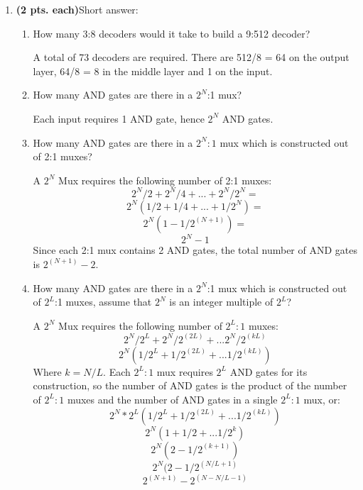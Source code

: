 \begin{enumerate}
\item {\bf (2 pts. each)}Short answer:
\begin{enumerate}
        \item How many 3:8 decoders would it take to build a 9:512 decoder?

	\begin{solution}{A total of 73 decoders are required.  There are 512/8 = 64 on
	the output layer, 64/8 = 8 in the middle layer and 1 on the input.}\end{solution}
        \item How many AND gates are there in a $2^N$:1 mux?

	\begin{solution}{ Each input requires 1 AND gate, hence $2^N$ AND gates.} \end{solution}
        \item How many AND gates are there in a $2^N:1$ mux which is
                constructed out of 2:1 muxes?

	\begin{solution}{ A $2^N$ Mux requires the following number of 2:1 muxes: 
        $$ 2^N/2 + 2^N/4 + ... + 2^N/2^N = $$
        $$ 2^N(1/2 + 1/4 + ... + 1/2^N) = $$
        $$ 2^N(1-1/2^(N+1)) =  $$
        $$ 2^N - 1  $$
	Since each 2:1 mux contains 2 AND gates, the total number of AND gates is
	$2^(N+1) - 2$.
	} \end{solution}

        \item How many AND gates are there in a $2^N$:1 mux which is
                constructed out of $2^L$:1 muxes, assume that
                $2^N$ is an integer multiple of $2^L$?

	\begin{solution}{
	A $2^N$ Mux requires the following number of $2^L:1$ muxes:
        $$ 2^N/2^L + 2^N/2^(2L) + ... 2^N/2^(kL) $$
        $$ 2^N(1/2^L + 1/2^(2L) + ... 1/2^(kL)) $$
	Where $k = N/L$.  Each $2^L:1$ mux requires $2^L$ AND gates for its construction,
	so the number of AND gates is the product of the number of $2^L:1$ muxes and the
	number of AND gates in a single $2^L:1$ mux, or:
        $$ 2^N * 2^L(1/2^L + 1/2^(2L) + ... 1/2^(kL)) $$
        $$ 2^N (1 + 1/2 + ... 1/2^k) $$
        $$ 2^N (2-1/2^(k+1)) $$
        $$ 2^N (2-1/2^(N/L+1) $$
        $$ 2^(N+1) - 2^(N-N/L-1) $$
	} \end{solution}

\end{enumerate}


\end{enumerate}
